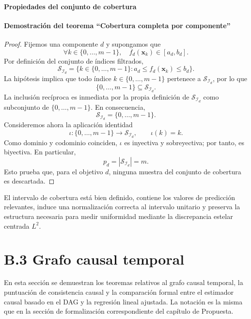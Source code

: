 \documentclass[12pt]{report} %
\begin{document}
\paragraph*{Propiedades del conjunto de cobertura}

\paragraph*{Demostración del teorema ``Cobertura completa por componente''}
\begin{proof}
    Fijemos una componente $d$ y supongamos que
    $$\forall k \in \{0, \ldots, m-1\},\quad f_d(\mathbf{x}_k) \in [a_d,b_d].$$
    Por definición del conjunto de índices filtrados,
    $$\mathcal{S}_{\mathcal{I}_d} = \{k \in \{0, \ldots, m-1\} : a_d \le f_d(\mathbf{x}_k) \le b_d\}.$$
    La hipótesis implica que todo índice $k \in \{0, \ldots, m-1\}$ pertenece a $\mathcal{S}_{\mathcal{I}_d}$, por lo que
    $$\{0, \ldots, m-1\} \subseteq \mathcal{S}_{\mathcal{I}_d}.$$
    La inclusión recíproca es inmediata por la propia definición de $\mathcal{S}_{\mathcal{I}_d}$ como subconjunto de $\{0, \ldots, m-1\}$. En consecuencia,
    $$\mathcal{S}_{\mathcal{I}_d} = \{0, \ldots, m-1\}.$$
    Consideremos ahora la aplicación identidad
    $$\iota : \{0, \ldots, m-1\} \to \mathcal{S}_{\mathcal{I}_d}, \qquad \iota(k) = k.$$
    Como dominio y codominio coinciden, $\iota$ es inyectiva y sobreyectiva; por tanto, es biyectiva. En particular,
    $$p_d = |\mathcal{S}_{\mathcal{I}_d}| = m.$$
    Esto prueba que, para el objetivo $d$, ninguna muestra del conjunto de cobertura es descartada.
\end{proof}

El intervalo de cobertura está bien definido, contiene los valores de predicción relevantes, induce una normalización correcta al intervalo unitario y preserva la estructura necesaria para medir uniformidad mediante la discrepancia estelar centrada $L^2$.

\section*{B.3 Grafo causal temporal}

En esta sección se demuestran los teoremas relativos al grafo causal temporal, la puntuación de consistencia causal y la comparación formal entre el estimador causal basado en el DAG y la regresión lineal ajustada. La notación es la misma que en la sección de formalización correspondiente del capítulo de Propuesta.
\end{document}
